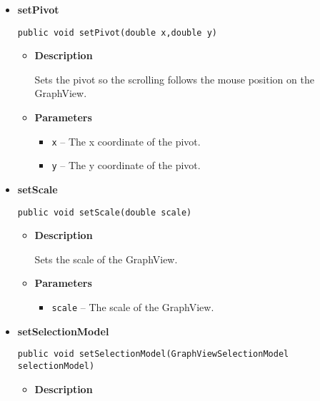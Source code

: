 {{{{{{{\begin{itemize}
{\begin{itemize}
{Sets a graph. Every element in the graph will be generated and then shown.
}
\item{
{\bf  Parameters}
  \begin{itemize}
   \item{
\texttt{graph} -- The graph to be visualized in the view.}
  \end{itemize}
}%
\end{itemize}
}%
\item{ 
{\bf  setPivot}\\
\begin{lstlisting}[frame=none]
public void setPivot(double x,double y)\end{lstlisting} %
\begin{itemize}
\item{
{\bf  Description}

Sets the pivot so the scrolling follows the mouse position on the GraphView.
}
\item{
{\bf  Parameters}
  \begin{itemize}
   \item{
\texttt{x} -- The x coordinate of the pivot.}
   \item{
\texttt{y} -- The y coordinate of the pivot.}
  \end{itemize}
}%
\end{itemize}
}%
\item{ 
{\bf  setScale}\\
\begin{lstlisting}[frame=none]
public void setScale(double scale)\end{lstlisting} %
\begin{itemize}
\item{
{\bf  Description}

Sets the scale of the GraphView.
}
\item{
{\bf  Parameters}
  \begin{itemize}
   \item{
\texttt{scale} -- The scale of the GraphView.}
  \end{itemize}
}%
\end{itemize}
}%
\item{ 
{\bf  setSelectionModel}\\
\begin{lstlisting}[frame=none]
public void setSelectionModel(GraphViewSelectionModel selectionModel)\end{lstlisting} %
\begin{itemize}
\item{
{\bf  Description}

}
\end{itemize}}
\end{itemize}}}}}}}}
